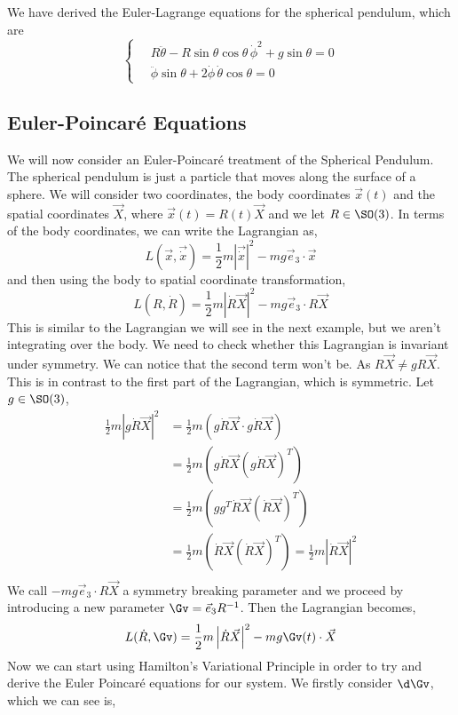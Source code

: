 We have derived the Euler-Lagrange equations for the spherical pendulum, which are
$$ \begin{cases}
  \quad R\ddot{\theta} - R\sin \theta \cos \theta\,\dot \phi^2 + g\sin \theta = 0\\
  \quad\ddot\phi\sin \theta + 2\dot \phi\,\dot\theta\cos \theta = 0
\end{cases} $$

\subsection{Euler-Poincar\'e Equations}
We will now consider an Euler-Poincar\'e treatment of the Spherical Pendulum. The spherical pendulum is just a particle that moves along the surface of a sphere. We will consider two coordinates, the body coordinates $\vec x(t)$ and the spatial coordinates $\vec X$, where $\vec x(t) = R(t)\vec X$ and we let $R \in \SO(3)$. In terms of the body coordinates, we can write the Lagrangian as,
$$ L(\vec x, \vec{\dot x}) = \frac{1}{2}m\left|\vec{\dot x}\right|^2 - mg\vec e_3 \cdot \vec x $$
and then using the body to spatial coordinate transformation,
$$ L\left(R, {\dot R}\right) = \frac{1}{2}m\left|{\dot R\vec X}\right|^2 - mg\vec e_3 \cdot R\vec {X} $$
This is similar to the Lagrangian we will see in the next example, but we aren't integrating over the body. We need to check whether this Lagrangian is invariant under symmetry. We can notice that the second term won't be. As $R\vec{X} \ne gR\vec{X}$. This is in contrast to the first part of the Lagrangian, which is symmetric. Let $g \in \SO(3)$,
\begin{align*}
  \frac{1}{2}m\left|{g\dot R \vec X}\right|^2 &= \frac{1}{2}m\left({g\dot R \vec X} \cdot {g\dot R \vec X}\right)\\
  &= \frac{1}{2}m\left({g\dot R \vec X} \left({g\dot R \vec X}\right)^T\right)\\
  &= \frac{1}{2}m\left({gg^T}{\dot R \vec X} \left({\dot R \vec X}\right)^T\right)\\
  &= \frac{1}{2}m\left({\dot R \vec X} \left({\dot R \vec X}\right)^T\right) = \frac{1}{2}m\left|{\dot R \vec X}\right|^2\\
\end{align*}
We call $-mg\vec e_3 \cdot R\vec{X}$ a symmetry breaking parameter and we proceed by introducing a new parameter $\Gv = \vec e_3R^{-1}$. Then the Lagrangian becomes,
$$ L(\dot R, \Gv) = \frac{1}{2}m\left| \dot R\vec X \right|^2 - mg\Gv(t) \cdot \vec X $$
Now we can start using Hamilton's Variational Principle in order to try and derive the Euler Poincar\'e equations for our system. We firstly consider $\d\Gv$, which we can see is,
